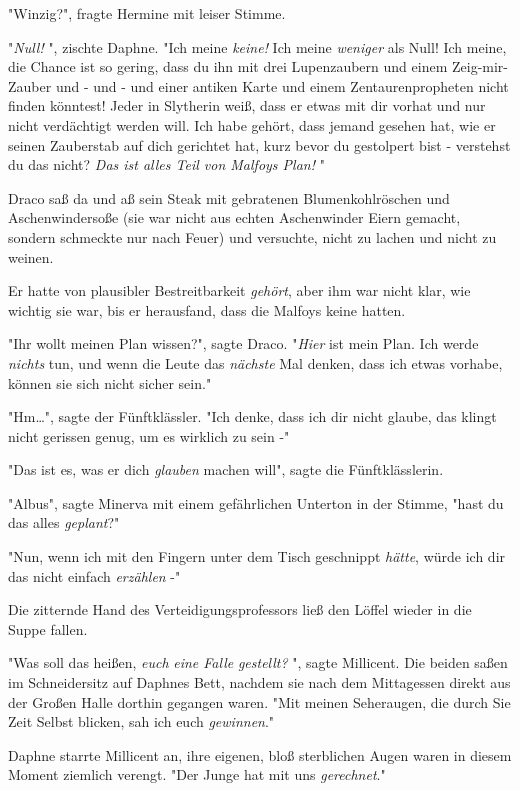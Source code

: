 {"Winzig?", fragte Hermine mit leiser Stimme.

"\emph{Null!} ", zischte Daphne. "Ich meine \emph{keine!} Ich meine \emph{weniger} als Null! Ich meine, die Chance ist so gering, dass du ihn mit drei Lupenzaubern und einem Zeig-mir-Zauber und - und - und einer antiken Karte und einem Zentaurenpropheten nicht finden könntest! Jeder in Slytherin weiß, dass er etwas mit dir vorhat und nur nicht verdächtigt werden will. Ich habe gehört, dass jemand gesehen hat, wie er seinen Zauberstab auf dich gerichtet hat, kurz bevor du gestolpert bist - verstehst du das nicht? \emph{Das ist alles Teil von Malfoys Plan!} "

Draco saß da und aß sein Steak mit gebratenen Blumenkohlröschen und Aschenwindersoße (sie war nicht aus echten Aschenwinder Eiern gemacht, sondern schmeckte nur nach Feuer) und versuchte, nicht zu lachen und nicht zu weinen.

Er hatte von plausibler Bestreitbarkeit \emph{gehört}, aber ihm war nicht klar, wie wichtig sie war, bis er herausfand, dass die Malfoys keine hatten.

"Ihr wollt meinen Plan wissen?", sagte Draco. "\emph{Hier} ist mein Plan. Ich werde \emph{nichts} tun, und wenn die Leute das \emph{nächste} Mal denken, dass ich etwas vorhabe, können sie sich nicht sicher sein."

"Hm…", sagte der Fünftklässler. "Ich denke, dass ich dir nicht glaube, das klingt nicht gerissen genug, um es wirklich zu sein -"

"Das ist es, was er dich \emph{glauben} machen will", sagte die Fünftklässlerin.

"Albus", sagte Minerva mit einem gefährlichen Unterton in der Stimme, "hast du das alles \emph{geplant}?"

"Nun, wenn ich mit den Fingern unter dem Tisch geschnippt \emph{hätte}, würde ich dir das nicht einfach \emph{erzählen} -"

Die zitternde Hand des Verteidigungsprofessors ließ den Löffel wieder in die Suppe fallen.

"Was soll das heißen, \emph{euch} \emph{eine Falle} \emph{gestellt?} ", sagte Millicent. Die beiden saßen im Schneidersitz auf Daphnes Bett, nachdem sie nach dem Mittagessen direkt aus der Großen Halle dorthin gegangen waren. "Mit meinen Seheraugen, die durch Sie Zeit Selbst blicken, sah ich euch \emph{gewinnen}."

Daphne starrte Millicent an, ihre eigenen, bloß sterblichen Augen waren in diesem Moment ziemlich verengt. "Der Junge hat mit uns \emph{gerechnet}."

}
